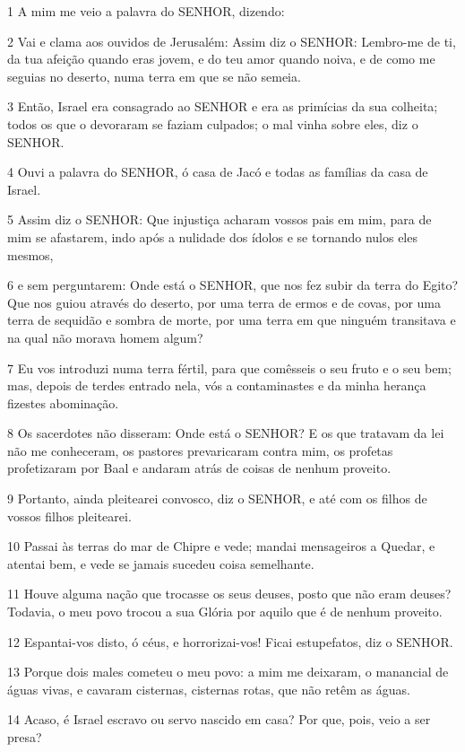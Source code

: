\par 1 A mim me veio a palavra do SENHOR, dizendo:
\par 2 Vai e clama aos ouvidos de Jerusalém: Assim diz o SENHOR: Lembro-me de ti, da tua afeição quando eras jovem, e do teu amor quando noiva, e de como me seguias no deserto, numa terra em que se não semeia.
\par 3 Então, Israel era consagrado ao SENHOR e era as primícias da sua colheita; todos os que o devoraram se faziam culpados; o mal vinha sobre eles, diz o SENHOR.
\par 4 Ouvi a palavra do SENHOR, ó casa de Jacó e todas as famílias da casa de Israel.
\par 5 Assim diz o SENHOR: Que injustiça acharam vossos pais em mim, para de mim se afastarem, indo após a nulidade dos ídolos e se tornando nulos eles mesmos,
\par 6 e sem perguntarem: Onde está o SENHOR, que nos fez subir da terra do Egito? Que nos guiou através do deserto, por uma terra de ermos e de covas, por uma terra de sequidão e sombra de morte, por uma terra em que ninguém transitava e na qual não morava homem algum?
\par 7 Eu vos introduzi numa terra fértil, para que comêsseis o seu fruto e o seu bem; mas, depois de terdes entrado nela, vós a contaminastes e da minha herança fizestes abominação.
\par 8 Os sacerdotes não disseram: Onde está o SENHOR? E os que tratavam da lei não me conheceram, os pastores prevaricaram contra mim, os profetas profetizaram por Baal e andaram atrás de coisas de nenhum proveito.
\par 9 Portanto, ainda pleitearei convosco, diz o SENHOR, e até com os filhos de vossos filhos pleitearei.
\par 10 Passai às terras do mar de Chipre e vede; mandai mensageiros a Quedar, e atentai bem, e vede se jamais sucedeu coisa semelhante.
\par 11 Houve alguma nação que trocasse os seus deuses, posto que não eram deuses? Todavia, o meu povo trocou a sua Glória por aquilo que é de nenhum proveito.
\par 12 Espantai-vos disto, ó céus, e horrorizai-vos! Ficai estupefatos, diz o SENHOR.
\par 13 Porque dois males cometeu o meu povo: a mim me deixaram, o manancial de águas vivas, e cavaram cisternas, cisternas rotas, que não retêm as águas.
\par 14 Acaso, é Israel escravo ou servo nascido em casa? Por que, pois, veio a ser presa?
